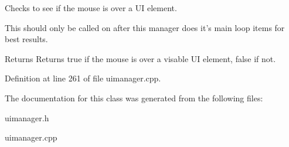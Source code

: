Checks to see if the mouse is over a UI element. 

This should only be called on after this manager does it's main loop items for best results. \begin{DoxyReturn}{Returns}
Returns true if the mouse is over a visable UI element, false if not. 
\end{DoxyReturn}


Definition at line 261 of file uimanager.cpp.



The documentation for this class was generated from the following files:\begin{DoxyCompactItemize}
\item 
uimanager.h\item 
uimanager.cpp\end{DoxyCompactItemize}
